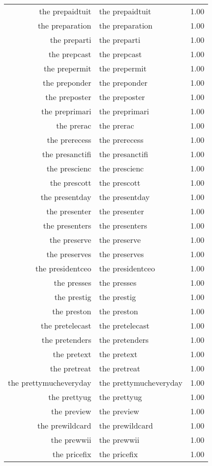 \begin{table}[ht]
\begin{tabular}{rlr}
  the prepaidtuit & the prepaidtuit & 1.00 \\ 
  the preparation & the preparation & 1.00 \\ 
  the preparti & the preparti & 1.00 \\ 
  the prepcast & the prepcast & 1.00 \\ 
  the prepermit & the prepermit & 1.00 \\ 
  the preponder & the preponder & 1.00 \\ 
  the preposter & the preposter & 1.00 \\ 
  the preprimari & the preprimari & 1.00 \\ 
  the prerac & the prerac & 1.00 \\ 
  the prerecess & the prerecess & 1.00 \\ 
  the presanctifi & the presanctifi & 1.00 \\ 
  the prescienc & the prescienc & 1.00 \\ 
  the prescott & the prescott & 1.00 \\ 
  the presentday & the presentday & 1.00 \\ 
  the presenter & the presenter & 1.00 \\ 
  the presenters & the presenters & 1.00 \\ 
  the preserve & the preserve & 1.00 \\ 
  the preserves & the preserves & 1.00 \\ 
  the presidentceo & the presidentceo & 1.00 \\ 
  the presses & the presses & 1.00 \\ 
  the prestig & the prestig & 1.00 \\ 
  the preston & the preston & 1.00 \\ 
  the pretelecast & the pretelecast & 1.00 \\ 
  the pretenders & the pretenders & 1.00 \\ 
  the pretext & the pretext & 1.00 \\ 
  the pretreat & the pretreat & 1.00 \\ 
  the prettymucheveryday & the prettymucheveryday & 1.00 \\ 
  the prettyug & the prettyug & 1.00 \\ 
  the preview & the preview & 1.00 \\ 
  the prewildcard & the prewildcard & 1.00 \\ 
  the prewwii & the prewwii & 1.00 \\ 
  the pricefix & the pricefix & 1.00 \\ 

\end{tabular}
\end{table}
